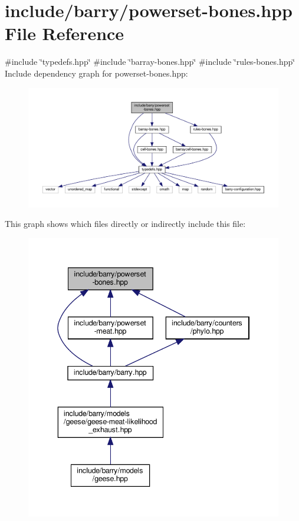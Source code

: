 \hypertarget{powerset-bones_8hpp}{}\section{include/barry/powerset-\/bones.hpp File Reference}
\label{powerset-bones_8hpp}
{\ttfamily \#include \char`\"{}typedefs.\+hpp\char`\"{}}\newline
{\ttfamily \#include \char`\"{}barray-\/bones.\+hpp\char`\"{}}\newline
{\ttfamily \#include \char`\"{}rules-\/bones.\+hpp\char`\"{}}\newline
Include dependency graph for powerset-\/bones.hpp\+:\nopagebreak
\begin{figure}[H]
\begin{center}
\leavevmode
\includegraphics[width=350pt]{powerset-bones_8hpp__incl}
\end{center}
\end{figure}
This graph shows which files directly or indirectly include this file\+:
\nopagebreak
\begin{figure}[H]
\begin{center}
\leavevmode
\includegraphics[width=340pt]{powerset-bones_8hpp__dep__incl}
\end{center}
\end{figure}
